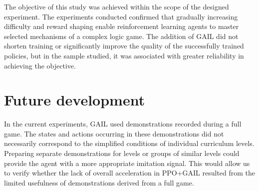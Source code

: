 The objective of this study was achieved within the scope of the designed experiment.
The experiments conducted confirmed that gradually increasing difficulty and reward shaping enable reinforcement learning agents to master selected mechanisms of a complex logic game. The addition of GAIL did not shorten training or significantly improve the quality of the successfully trained policies, but in the sample studied, it was associated with greater reliability in achieving the objective.


\section{Future development}



In the current experiments, GAIL used demonstrations recorded during a full game. The states and actions occurring in these demonstrations did not necessarily correspond to the simplified conditions of individual curriculum levels. Preparing separate demonstrations for levels or groups of similar levels could provide the agent with a more appropriate imitation signal. This would allow us to verify whether the lack of overall acceleration in PPO+GAIL resulted from the limited usefulness of demonstrations derived from a full game.

